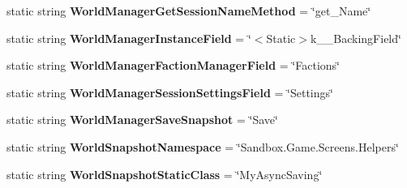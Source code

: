 \begin{DoxyCompactItemize}
\item 
\hypertarget{class_s_e_mod_a_p_i_internal_1_1_a_p_i_1_1_common_1_1_world_manager_aed3c3826f05f17b36a37cc9a1b374f91}{}static string {\bfseries World\+Manager\+Get\+Session\+Name\+Method} = \char`\"{}get\+\_\+\+Name\char`\"{}\label{class_s_e_mod_a_p_i_internal_1_1_a_p_i_1_1_common_1_1_world_manager_aed3c3826f05f17b36a37cc9a1b374f91}

\item 
\hypertarget{class_s_e_mod_a_p_i_internal_1_1_a_p_i_1_1_common_1_1_world_manager_aa6fe903c54c0962d28b8458fbe24652b}{}static string {\bfseries World\+Manager\+Instance\+Field} = \char`\"{}$<$Static$>$k\+\_\+\+\_\+\+Backing\+Field\char`\"{}\label{class_s_e_mod_a_p_i_internal_1_1_a_p_i_1_1_common_1_1_world_manager_aa6fe903c54c0962d28b8458fbe24652b}

\item 
\hypertarget{class_s_e_mod_a_p_i_internal_1_1_a_p_i_1_1_common_1_1_world_manager_acbb0941cf11e5de6199b2496fcbe5d96}{}static string {\bfseries World\+Manager\+Faction\+Manager\+Field} = \char`\"{}Factions\char`\"{}\label{class_s_e_mod_a_p_i_internal_1_1_a_p_i_1_1_common_1_1_world_manager_acbb0941cf11e5de6199b2496fcbe5d96}

\item 
\hypertarget{class_s_e_mod_a_p_i_internal_1_1_a_p_i_1_1_common_1_1_world_manager_aa99b2fe53bc48bbd3116792c58a9bf27}{}static string {\bfseries World\+Manager\+Session\+Settings\+Field} = \char`\"{}Settings\char`\"{}\label{class_s_e_mod_a_p_i_internal_1_1_a_p_i_1_1_common_1_1_world_manager_aa99b2fe53bc48bbd3116792c58a9bf27}

\item 
\hypertarget{class_s_e_mod_a_p_i_internal_1_1_a_p_i_1_1_common_1_1_world_manager_a0b1af5be7c953144eb556a47f13b4fa4}{}static string {\bfseries World\+Manager\+Save\+Snapshot} = \char`\"{}Save\char`\"{}\label{class_s_e_mod_a_p_i_internal_1_1_a_p_i_1_1_common_1_1_world_manager_a0b1af5be7c953144eb556a47f13b4fa4}

\item 
\hypertarget{class_s_e_mod_a_p_i_internal_1_1_a_p_i_1_1_common_1_1_world_manager_a1d74e3a3502163ab3131020c681c6d37}{}static string {\bfseries World\+Snapshot\+Namespace} = \char`\"{}Sandbox.\+Game.\+Screens.\+Helpers\char`\"{}\label{class_s_e_mod_a_p_i_internal_1_1_a_p_i_1_1_common_1_1_world_manager_a1d74e3a3502163ab3131020c681c6d37}

\item 
\hypertarget{class_s_e_mod_a_p_i_internal_1_1_a_p_i_1_1_common_1_1_world_manager_a882b363d4ee839513f60d55b62b8675c}{}static string {\bfseries World\+Snapshot\+Static\+Class} = \char`\"{}My\+Async\+Saving\char`\"{}\label{class_s_e_mod_a_p_i_internal_1_1_a_p_i_1_1_common_1_1_world_manager_a882b363d4ee839513f60d55b62b8675c}


\end{DoxyCompactItemize}
